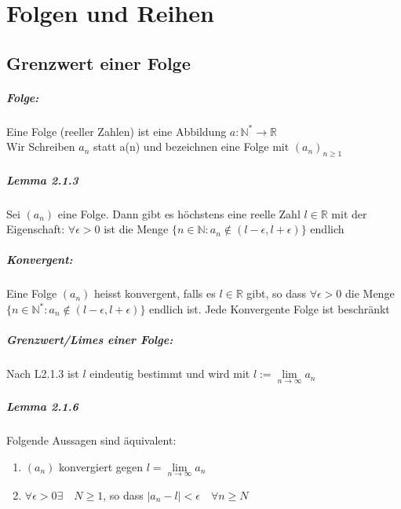 \documentclass[8pt]{extreport}
\begin{document}
\chapter{Folgen und Reihen}
\section{Grenzwert einer Folge}

\paragraph{Folge:} Eine Folge (reeller Zahlen) ist eine Abbildung $a:\mathbb{N}^* \rightarrow \mathbb{R}$\\
Wir Schreiben $a_{n}$ statt a(n) und bezeichnen eine Folge mit $(a_{n})_{n\geq 1}$
\paragraph{Lemma 2.1.3} Sei $(a_{n})$ eine Folge. Dann gibt es höchstens eine reelle Zahl $\mathit{l} \in \mathbb{R}$ mit der Eigenschaft: $\forall \epsilon > 0$ ist die Menge $\{ n \in \mathbb{N} : a_{n} \notin (\mathit{l - \epsilon},\mathit{l+\epsilon}) \}$ endlich
\paragraph{Konvergent:} Eine Folge $(a_{n})$ heisst konvergent, falls es $\mathit{l} \in \mathbb{R}$ gibt, so dass $\forall \epsilon > 0$ die Menge $\{ n \in \mathbb{N}^* : a_{n} \notin (\mathit{l - \epsilon},\mathit{l + \epsilon})\}$ endlich ist.
Jede Konvergente Folge ist beschränkt
\paragraph{Grenzwert/Limes einer Folge:} Nach L2.1.3 ist $\mathit{l}$ eindeutig bestimmt und wird mit $\mathit{l} := \lim \limits_{ n \to \infty} a_{n}$
\paragraph{Lemma 2.1.6} Folgende Aussagen sind äquivalent:
\begin{enumerate}
\item $(a_{n})$ konvergiert gegen $\mathit{l} = \lim\limits_{n \to \infty} a_{n}$
\item $\forall \epsilon > 0 \exists \quad N \geq 1$, so dass $|a_{n} - \mathit{l}| < \epsilon \quad \forall n\geq N$
\end{enumerate}
\end{document}
